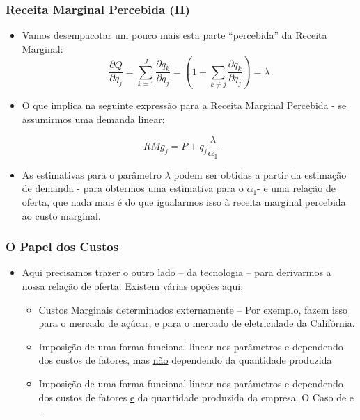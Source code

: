 \documentclass{beamer}
\begin{document}
\begin{frame}\frametitle{Receita Marginal Percebida (II)}

\begin{itemize}
\item Vamos desempacotar um pouco mais esta parte ``percebida'' da Receita
Marginal:
\[
\frac{\partial Q}{\partial q_{j}}=\sum_{k=1}^{J}\frac{\partial q_{k}}{\partial q_{j}}=\left(1+\sum_{k\neq j}\frac{\partial q_{k}}{\partial q_{j}}\right)=\lambda
\]
\item O que implica na seguinte expressão para a Receita Marginal Percebida
- se assumirmos uma demanda linear:
\end{itemize}
\[
RMg_{j}=P+q_{j}\frac{\lambda}{\alpha_{1}}
\]

\begin{itemize}
\item As estimativas para o parâmetro $\lambda$ podem ser obtidas a partir
da estimação de demanda - para obtermos uma estimativa para o $\alpha_{1}$-
e uma relação de oferta, que nada mais é do que igualarmos isso à
receita marginal percebida ao custo marginal.
\end{itemize}
\end{frame}

\begin{frame}\frametitle{O Papel dos Custos}
\begin{itemize}
\item Aqui precisamos trazer o outro lado -- da tecnologia -- para derivarmos a nossa relação de oferta. Existem várias
opções aqui:
\begin{itemize}
\item Custos Marginais determinados externamente -- Por exemplo, \citet{Genesove1998a}  fazem isso para o mercado de açúcar, e \citet{Wolfram1999a} para o mercado de eletricidade da Califórnia.
\item Imposição de uma forma funcional linear nos parâmetros e dependendo dos custos de fatores, mas \uline{não} dependendo da quantidade produzida 
\item Imposição de uma forma funcional linear nos parâmetros e dependendo dos custos de fatores \uline{e} da quantidade produzida da empresa. O Caso de \citet{Bresnahan1982a} e \citet{Lau1982a}.
\end{itemize}
\end{itemize}
\end{frame}
\end{document}
